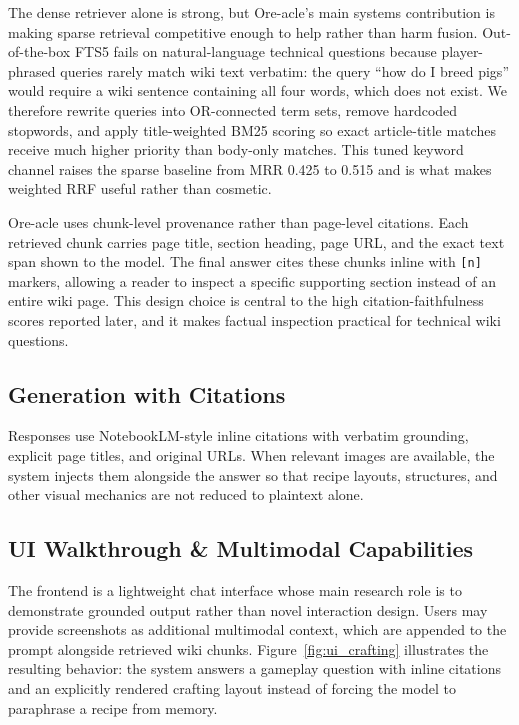 \documentclass[11pt,a4paper]{article}
\begin{document}
The dense retriever alone is strong, but Ore-acle's main systems contribution is making sparse retrieval competitive enough to help rather than harm fusion. Out-of-the-box FTS5 fails on natural-language technical questions because player-phrased queries rarely match wiki text verbatim: the query ``how do I breed pigs'' would require a wiki sentence containing all four words, which does not exist. We therefore rewrite queries into OR-connected term sets, remove hardcoded stopwords, and apply title-weighted BM25 scoring so exact article-title matches receive much higher priority than body-only matches. This tuned keyword channel raises the sparse baseline from MRR 0.425 to 0.515 and is what makes weighted RRF useful rather than cosmetic.

Ore-acle uses chunk-level provenance rather than page-level citations. Each retrieved chunk carries page title, section heading, page URL, and the exact text span shown to the model. The final answer cites these chunks inline with \texttt{[n]} markers, allowing a reader to inspect a specific supporting section instead of an entire wiki page. This design choice is central to the high citation-faithfulness scores reported later, and it makes factual inspection practical for technical wiki questions.

\subsection{Generation with Citations}

Responses use NotebookLM-style inline citations with verbatim grounding, explicit page titles, and original URLs. When relevant images are available, the system injects them alongside the answer so that recipe layouts, structures, and other visual mechanics are not reduced to plaintext alone.

\subsection{UI Walkthrough \& Multimodal Capabilities}
The frontend is a lightweight chat interface whose main research role is to demonstrate grounded output rather than novel interaction design. Users may provide screenshots as additional multimodal context, which are appended to the prompt alongside retrieved wiki chunks. Figure~\ref{fig:ui_crafting} illustrates the resulting behavior: the system answers a gameplay question with inline citations and an explicitly rendered crafting layout instead of forcing the model to paraphrase a recipe from memory.
\end{document}
